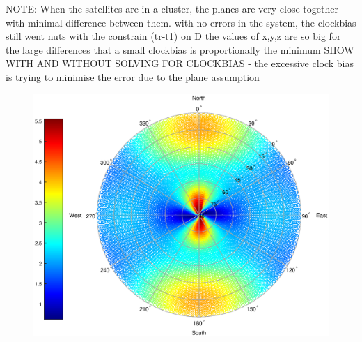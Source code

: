 NOTE: When the satellites are in a cluster, the planes are very close together with minimal difference between them.
with no errors in the system, the clockbias still went nuts with the constrain (tr-t1) on D
the values of x,y,z are so big for the large differences that a small clockbias is proportionally the minimum
SHOW WITH AND WITHOUT SOLVING FOR CLOCKBIAS
- the excessive clock bias is trying to minimise the error due to the plane assumption

\begin{figure}
\centering
\caption{}
\label{fig:plane_total_north1_pow4}
\includegraphics[width=0.7\linewidth]{ChapterExperiments/Figures/plane_total_north1_pow4}
\end{figure}

